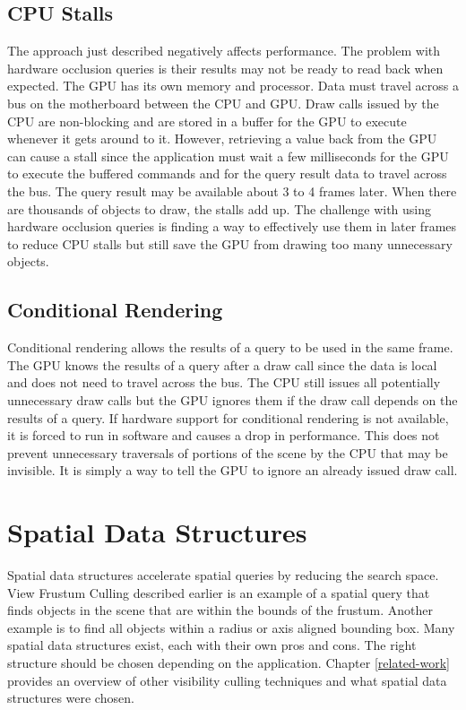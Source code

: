 \documentclass[12pt]{ucthesis}
\begin{document}
\subsection{CPU Stalls}
\label{cpu-stalls}

The approach just described negatively affects performance.
The problem with hardware occlusion queries is their results may not be ready to read back when expected.\cite{GpuGem-Occlusion, GpuGem-Queries, CHC, CHCpp}
The GPU has its own memory and processor.
Data must travel across a bus on the motherboard between the CPU and GPU.
Draw calls issued by the CPU are non-blocking and are stored in a buffer for the GPU to execute whenever it gets around to it.
However, retrieving a value back from the GPU can cause a stall since the application must wait a few milliseconds for the GPU to execute the buffered commands and for the query result data to travel across the bus.
The query result may be available about 3 to 4 frames later.
When there are thousands of objects to draw, the stalls add up.
The challenge with using hardware occlusion queries is finding a way to effectively use them in later frames to reduce CPU stalls but still save the GPU from drawing too many unnecessary objects.

\subsection{Conditional Rendering}
\label{conditional-rendering}

Conditional rendering allows the results of a query to be used in the same frame.
The GPU knows the results of a query after a draw call since the data is local and does not need to travel across the bus.
The CPU still issues all potentially unnecessary draw calls but the GPU ignores them if the draw call depends on the results of a query.
If hardware support for conditional rendering is not available, it is forced to run in software and causes a drop in performance.
This does not prevent unnecessary traversals of portions of the scene by the CPU that may be invisible.
It is simply a way to tell the GPU to ignore an already issued draw call.

\section{Spatial Data Structures}
\label{spatial-data-structures}

Spatial data structures accelerate spatial queries by reducing the search space.
View Frustum Culling described earlier is an example of a spatial query that finds objects in the scene that are within the bounds of the frustum.
Another example is to find all objects within a radius or axis aligned bounding box.
Many spatial data structures exist, each with their own pros and cons.
The right structure should be chosen depending on the application.
Chapter \ref{related-work} provides an overview of other visibility culling techniques and what spatial data structures were chosen.
\end{document}
